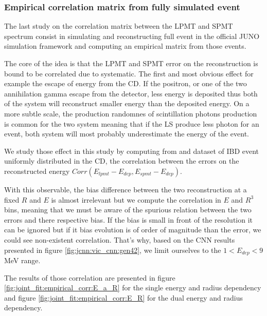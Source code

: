 \documentclass[../main.tex]{subfiles}
\begin{document}
\subsubsection{Empirical correlation matrix from fully simulated event}

The last study on the correlation matrix between the LPMT and SPMT spectrum consist in simulating and reconstructing full event in the official JUNO simulation framework and computing an empirical matrix from those events.

The core of the idea is that the LPMT and SPMT error on the reconstruction is bound to be correlated due to systematic. The first and most obvious effect for example the escape of energy from the CD. If the positron, or one of the two annihilation gamma escape from the detector, less energy is deposited thus both of the system will reconstruct smaller energy than the deposited energy. On a more subtle scale, the production randomnes of scintillation photons production is common for the two system meaning that if the LS produce less photon for an event, both system will most probably underestimate the energy of the event.

We study those effect in this study by computing from and dataset of IBD event uniformly distributed in the CD, the correlation between the errors on the reconstructed energy $Corr(E_{lpmt} - E_{dep}, E_{spmt} - E_{dep})$.

With this observable, the bias difference between the two reconstruction at a fixed $R$ and $E$ is almost irrelevant but we compute the correlation in $E$ and $R^3$ bins, meaning that we must be aware of the spurious relation between the two errors and there respective bias. If the bias is small in front of the resolution it can be ignored but if it bias evolution is of order of magnitude than the error, we could see non-existent correlation. That's why, based on the CNN results presented in figure \ref{fig:jcnn:vic_cnn:gen42}, we limit ourselves to the $ 1 < E_{dep} < 9$ MeV range.

The results of those correlation are presented in figure \ref{fig:joint_fit:empirical_corr:E_a_R} for the single energy and radius dependency and figure \ref{fig:joint_fit:empirical_corr:E_R} for the dual energy and radius dependency.
\end{document}
